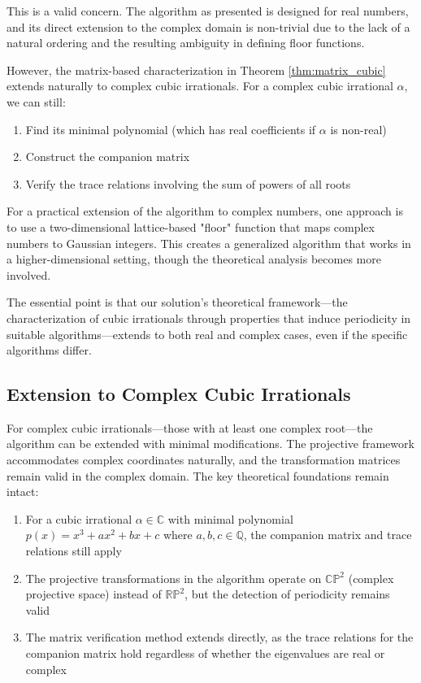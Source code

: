\begin{response}
This is a valid concern. The \HAPD{} algorithm as presented is designed for real numbers, and its direct extension to the complex domain is non-trivial due to the lack of a natural ordering and the resulting ambiguity in defining floor functions.

However, the matrix-based characterization in Theorem \ref{thm:matrix_cubic} extends naturally to complex cubic irrationals. For a complex cubic irrational $\alpha$, we can still:
\begin{enumerate}
    \item Find its minimal polynomial (which has real coefficients if $\alpha$ is non-real)
    \item Construct the companion matrix
    \item Verify the trace relations involving the sum of powers of all roots
\end{enumerate}

For a practical extension of the \HAPD{} algorithm to complex numbers, one approach is to use a two-dimensional lattice-based "floor" function that maps complex numbers to Gaussian integers. This creates a generalized \HAPD{} algorithm that works in a higher-dimensional setting, though the theoretical analysis becomes more involved.

The essential point is that our solution's theoretical framework—the characterization of cubic irrationals through properties that induce periodicity in suitable algorithms—extends to both real and complex cases, even if the specific algorithms differ.
\end{response}

\subsection{Extension to Complex Cubic Irrationals}

For complex cubic irrationals—those with at least one complex root—the \HAPD{} algorithm can be extended with minimal modifications. The projective framework accommodates complex coordinates naturally, and the transformation matrices remain valid in the complex domain. The key theoretical foundations remain intact:

\begin{enumerate}
    \item For a cubic irrational $\alpha \in \mathbb{C}$ with minimal polynomial $p(x) = x^3 + ax^2 + bx + c$ where $a,b,c \in \mathbb{Q}$, the companion matrix and trace relations still apply
    
    \item The projective transformations in the \HAPD{} algorithm operate on $\mathbb{CP}^2$ (complex projective space) instead of $\mathbb{RP}^2$, but the detection of periodicity remains valid
    
    \item The matrix verification method extends directly, as the trace relations for the companion matrix hold regardless of whether the eigenvalues are real or complex
\end{enumerate}

